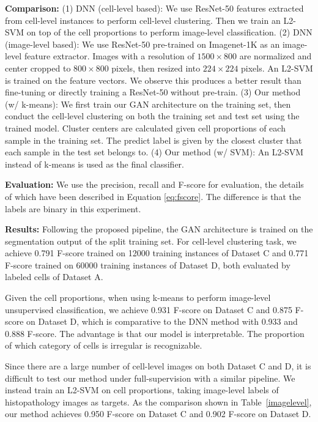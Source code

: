 \documentclass[journal]{IEEEtran}
\begin{document}
{\textbf{Comparison:} (1) DNN (cell-level based): We use ResNet-50 features extracted from cell-level instances to perform cell-level clustering. Then we train an L2-SVM on top of the cell proportions to perform image-level classification. (2) DNN (image-level based): We use ResNet-50 pre-trained on Imagenet-1K as an image-level feature extractor. Images with a resolution of $1500 \times 800$ are normalized and center cropped to $800 \times 800$ pixels, then resized into $224 \times 224$ pixels. An L2-SVM is trained on the feature vectors. We observe this produces a better result than fine-tuning or directly training a ResNet-50 without pre-train.} (3) Our method (w/ k-means): We first train our GAN architecture on the training set, then conduct the cell-level clustering on both the training set and test set using the trained model. Cluster centers are calculated given cell proportions of each sample in the training set. The predict label is given by the closest cluster that each sample in the test set belongs to. (4) Our method (w/ SVM): An L2-SVM instead of k-means is used as the final classifier.

\textbf{Evaluation:} We use the precision, recall and F-score for evaluation, the details of which have been described in Equation \ref{eq:fscore}. The difference is that the labels are binary in this experiment.


{{\textbf{Results:} Following the proposed pipeline, the GAN architecture is trained on the segmentation output of the split training set. For cell-level clustering task, we achieve 0.791 F-score trained on 12000 training instances of Dataset C and 0.771 F-score trained on 60000 training instances of Dataset D, both evaluated by labeled cells of Dataset A.

Given the cell proportions, when using k-means to perform image-level unsupervised classification, we achieve 0.931 F-score on Dataset C and 0.875 F-score on Dataset D, which is comparative to the DNN method with 0.933 and 0.888 F-score. The advantage is that our model is interpretable. The proportion of which category of cells is irregular is recognizable.

Since there are a large number of cell-level images on both Dataset C and D, it is difficult to test our method under full-supervision with a similar pipeline. We instead train an L2-SVM on cell proportions, taking image-level labels of histopathology images as targets. As the comparison shown in Table~\ref{imagelevel}, our method achieves 0.950 F-score on Dataset C and 0.902 F-score on Dataset D.}}
\end{document}
